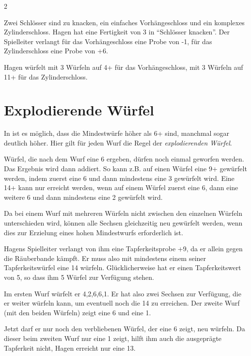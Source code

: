 \begin{multicols}{2}
\begin{pexample}[Beispiel]
Zwei Schlösser sind zu knacken, ein einfaches Vorhängeschloss und ein komplexes Zylinderschloss. Hagen hat eine Fertigkeit von 3 in ``Schlösser knacken''. Der Spielleiter verlangt für das Vorhängeschloss eine Probe von -1, für das Zylinderschloss eine Probe von +6.

Hagen würfelt mit 3 Würfeln auf 4+ für das Vorhängeschloss, mit 3 Würfeln auf 11+ für das Zylinderschloss.
\end{pexample}

\section{Explodierende Würfel}

In  ist es möglich, dass die Mindestwürfe höher als 6+ sind, manchmal sogar deutlich höher. Hier gilt für jeden Wurf die Regel der \textit{explodierenden Würfel}.

Würfel, die nach dem Wurf eine 6 ergeben, dürfen noch einmal geworfen werden. Das Ergebnis wird dann addiert. So kann z.B. auf einen Würfel eine 9+ gewürfelt werden, indem zuerst eine 6 und dann mindestens eine 3 gewürfelt wird. Eine 14+ kann nur erreicht werden, wenn auf einem Würfel zuerst eine 6, dann eine weitere 6 und dann mindestens eine 2 gewürfelt wird.

Da bei einem Wurf mit mehreren Würfeln nicht zwischen den einzelnen Würfeln unterschieden wird, können alle Sechsen gleichzeitig neu gewürfelt werden, wenn dies zur Erzielung eines hohen Mindestwurfs erforderlich ist.

\begin{pexample}[Beispiel]
Hagens Spielleiter verlangt von ihm eine Tapferkeitsprobe +9, da er allein gegen die Räuberbande kämpft. Er muss also mit mindestens einem seiner Tapferkeitswürfel eine 14 würfeln. Glücklicherweise hat er einen Tapferkeitswert von 5, so dass ihm 5 Würfel zur Verfügung stehen.

Im ersten Wurf würfelt er 4,2,6,6,1. Er hat also zwei Sechsen zur Verfügung, die er weiter würfeln kann, um eventuell noch die 14 zu erreichen. Der zweite Wurf (mit den beiden Würfeln) zeigt eine 6 und eine 1.

Jetzt darf er nur noch den verbliebenen Würfel, der eine 6 zeigt, neu würfeln. Da dieser beim zweiten Wurf nur eine 1 zeigt, hilft ihm auch die ausgeprägte Tapferkeit nicht, Hagen erreicht nur eine 13.
\end{pexample}


\end{multicols}
